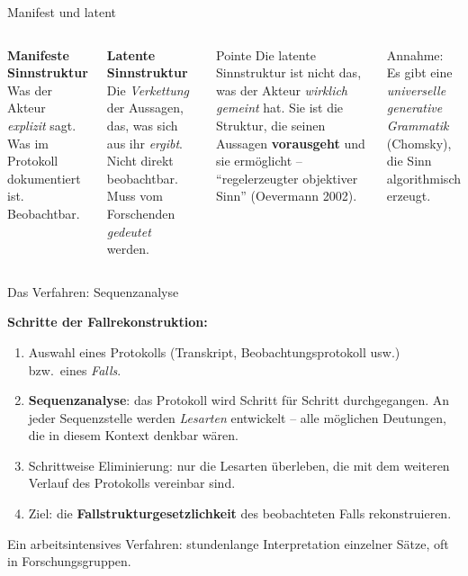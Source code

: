 \documentclass[aspectratio=169,11pt]{beamer}
\let\oldemph\emph
\renewcommand{\emph}[1]{{\color{solCyan}\oldemph{#1}}}
\let\oldtextbf\textbf
\renewcommand{\textbf}[1]{{\color{solBase3}\oldtextbf{#1}}}
\begin{document}
\begin{frame}{Manifest und latent}

  \begin{columns}[T,onlytextwidth]
    \textbf{Manifeste Sinnstruktur} \\[2pt]
    Was der Akteur \emph{explizit} sagt. Was im Protokoll dokumentiert
    ist. Beobachtbar.

    \vspace{1.5em}
    \textbf{Latente Sinnstruktur} \\[2pt]
    Die \emph{Verkettung} der Aussagen, das, was sich aus ihr
    \emph{ergibt}. Nicht direkt beobachtbar. Muss vom Forschenden
    \emph{gedeutet} werden.

    \begin{block}{Pointe}
      Die latente Sinnstruktur ist nicht das, was der Akteur
      \emph{wirklich gemeint} hat. Sie ist die Struktur, die
      seinen Aussagen \textbf{vorausgeht} und sie ermöglicht –
      \enquote{regelerzeugter objektiver Sinn} (Oevermann 2002).
    \end{block}

    \vspace{0.5em}
    \footnotesize\color{black!60}
    Annahme: Es gibt eine \emph{universelle generative Grammatik}
    (Chomsky), die Sinn algorithmisch erzeugt.
  \end{columns}

\end{frame}

\begin{frame}{Das Verfahren: Sequenzanalyse}

  \textbf{Schritte der Fallrekonstruktion:}

  \vfill
  \begin{enumerate}
    \item Auswahl eines Protokolls (Transkript, Beobachtungs\-protokoll
          usw.) bzw.\ eines \emph{Falls}.
    \vfill
    \item \textbf{Sequenzanalyse}: das Protokoll wird Schritt für
          Schritt durchgegangen. An jeder Sequenzstelle werden
          \emph{Lesarten} entwickelt – alle möglichen Deutungen,
          die in diesem Kontext denkbar wären.
    \vfill
    \item Schrittweise Eliminierung: nur die Lesarten überleben,
          die mit dem weiteren Verlauf des Protokolls vereinbar sind.
    \vfill
    \item Ziel: die \textbf{Fallstrukturgesetzlichkeit} des
          beobachteten Falls rekonstruieren.
  \end{enumerate}

  \vfill
  \footnotesize\color{black!60}
  Ein arbeitsintensives Verfahren: stundenlange Interpretation
  einzelner Sätze, oft in Forschungsgruppen.

\end{frame}
\end{document}
